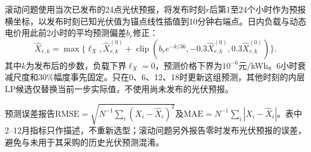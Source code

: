 滚动问题使用当次已发布的24点光伏预报，将发布时刻$r$后第1至24个小时作为预报横坐标，以发布时刻已知光伏值为锚点线性插值到10分钟右端点。日内负载与动态电价用此前2小时的平均预测偏差$b_r$修正：
\begin{equation}
 \widehat X_{r,k}=\max\{\ell_X,\widehat X^{(0)}_{r,k}
 +\operatorname{clip}(b_r e^{-k/36},-0.3\widehat X^{(0)}_{r,k},0.3\widehat X^{(0)}_{r,k})\}.
 \label{eq:issue_correction}
\end{equation}
其中$k$为发布后的步数，负载下界$\ell_X=0$，预测价格下界为$10^{-6}$元/kWh。6小时衰减尺度和30\%幅度事先固定。只在0、6、12、18时更新这组预测，其他时刻的内层LP候选仅替换当前一步实际值，不使用尚未发布的光伏预报。

预测误差报告$\mathrm{RMSE}=\sqrt{N^{-1}\sum_i(X_i-\widehat X_i)^2}$及$\mathrm{MAE}=N^{-1}\sum_i|X_i-\widehat X_i|$。表中2--12月指标只作描述，不重新选型；滚动问题另外报告零时发布光伏预报的误差，避免与未用于其采购的历史光伏预测混淆。

